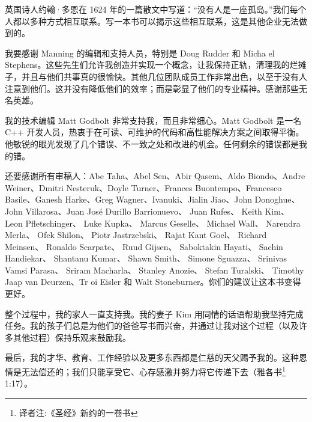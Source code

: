 英国诗人约翰·多恩在 1624 年的一篇散文中写道：“没有人是一座孤岛。”我们每个人都以多种方式相互联系。写一本书可以揭示这些相互联系，这是其他企业无法做到的。

我要感谢 Manning 的编辑和支持人员，特别是 Doug Rudder 和 Micha el Stephens。这些先生们允许我创造并实现一个概念，让我保持正轨，清理我的烂摊子，并且与他们共事真的很愉快。其他几位团队成员工作非常出色，以至于没有人注意到他们。这并没有降低他们的效率；而是彰显了他们的专业精神。感谢那些无名英雄。

我的技术编辑 Matt Godbolt 非常支持我，而且非常细心。Matt Godbolt 是一名 C++ 开发人员，热衷于在可读、可维护的代码和高性能解决方案之间取得平衡。他敏锐的眼光发现了几个错误、不一致之处和改进的机会。任何剩余的错误都是我的错。

还要感谢所有审稿人：Abe Taha、Abel Sen、Abir Qasem、Aldo Biondo、Andre Weiner、Dmitri Nesteruk、Doyle Turner、Frances Buontempo、Francesco Basile、Ganesh Harke、Greg Wagner、Ivanuki、Jialin Jiao、John Donoghue、 John Villarosa、Juan José Durillo Barrionuevo、 Juan Rufes、 Keith Kim、 Leon Pfletschinger、 Luke Kupka、 Marcus Geselle、 Michael Wall、 Narendra
Merla、 Ofek Shilon、 Piotr Jastrzebski、 Rajat Kant Goel、 Richard
Meinsen、 Ronaldo Scarpate、 Ruud Gijsen、 Saboktakin Hayati、
Sachin Handiekar、 Shantanu Kumar、 Shawn Smith、 Simone
Sguazza、 Srinivas Vamsi Parasa、 Sriram Macharla、 Stanley Anozie、
Stefan Turalski、 Timothy Jaap van Deurzen、Tr oi Eisler 和 Walt Stoneburner。你们的建议让这本书变得更好。

整个过程中，我的家人一直支持我。我的妻子 Kim 用同情的话语帮助我坚持完成任务。我的孩子们总是为他们的爸爸写书而兴奋，并通过让我对这个过程（以及许多其他过程）保持乐观来鼓励我。

最后，我的才华、教育、工作经验以及更多东西都是仁慈的天父赐予我的。这种恩情是无法偿还的；我们只能享受它、心存感激并努力将它传递下去（雅各书\footnote{译者注:《圣经》新约的一卷书} 1:17）。
